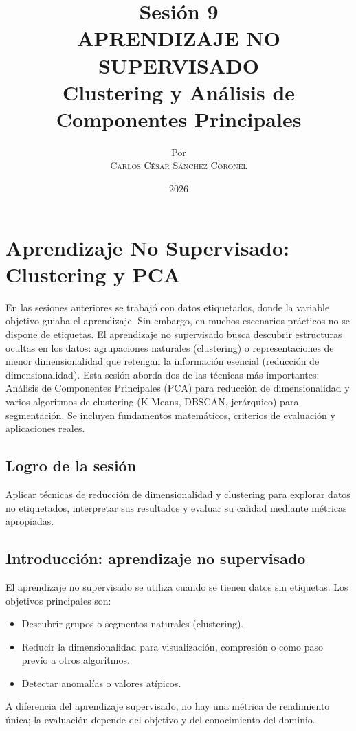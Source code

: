 \documentclass[12pt,a4paper,openany,oneside]{book}
\title{
    \textbf{Sesión 9} \\ 
    \Huge \textbf{APRENDIZAJE NO SUPERVISADO} \\
    \Large Clustering y Análisis de Componentes Principales
}
\author{
    \small Por \\ \vspace{0.2cm}
    \Large \textsc{Carlos César Sánchez Coronel}
}
\date{2026}
\begin{document}
\maketitle
\tableofcontents
{}

\chapter{Aprendizaje No Supervisado: Clustering y PCA}

En las sesiones anteriores se trabajó con datos etiquetados, donde la variable objetivo guiaba el aprendizaje. Sin embargo, en muchos escenarios prácticos no se dispone de etiquetas. El aprendizaje no supervisado busca descubrir estructuras ocultas en los datos: agrupaciones naturales (clustering) o representaciones de menor dimensionalidad que retengan la información esencial (reducción de dimensionalidad). Esta sesión aborda dos de las técnicas más importantes: Análisis de Componentes Principales (PCA) para reducción de dimensionalidad y varios algoritmos de clustering (K-Means, DBSCAN, jerárquico) para segmentación. Se incluyen fundamentos matemáticos, criterios de evaluación y aplicaciones reales.

\section{Logro de la sesión}
Aplicar técnicas de reducción de dimensionalidad y clustering para explorar datos no etiquetados, interpretar sus resultados y evaluar su calidad mediante métricas apropiadas.

\section{Introducción: aprendizaje no supervisado}
El aprendizaje no supervisado se utiliza cuando se tienen datos sin etiquetas. Los objetivos principales son:
\begin{itemize}
    \item Descubrir grupos o segmentos naturales (clustering).
    \item Reducir la dimensionalidad para visualización, compresión o como paso previo a otros algoritmos.
    \item Detectar anomalías o valores atípicos.
\end{itemize}
A diferencia del aprendizaje supervisado, no hay una métrica de rendimiento única; la evaluación depende del objetivo y del conocimiento del dominio.
\end{document}
